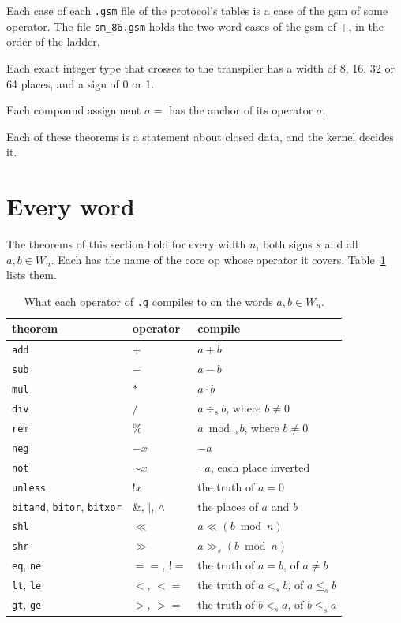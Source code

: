 \begin{theorem}
Each case of each \texttt{.gsm} file of the protocol's tables is a case of the gsm of some operator. The file
\texttt{sm\_86.gsm} holds the two-word cases of the gsm of $+$, in the order of the ladder.
\end{theorem}

\begin{theorem}
Each exact integer type that crosses to the transpiler has a width of 8, 16, 32 or 64 places, and a sign of 0 or 1.
\end{theorem}

\begin{theorem}
Each compound assignment $\sigma{=}$ has the anchor of its operator $\sigma$.
\end{theorem}

Each of these theorems is a statement about closed data, and the kernel decides it.

\section{Every word}

The theorems of this section hold for every width $n$, both signs $s$ and all $a, b \in W_n$. Each has the name
of the core op whose operator it covers. Table~\ref{tab:g-compile} lists them.

\begin{table}[ht]
\centering
\caption{What each operator of \texttt{.g} compiles to on the words $a, b \in W_n$.}\label{tab:g-compile}
\begin{tabular}{lll}
\toprule
theorem & operator & compile \\
\midrule
\texttt{add} & $+$ & $a + b$ \\
\texttt{sub} & $-$ & $a - b$ \\
\texttt{mul} & $*$ & $a \cdot b$ \\
\texttt{div} & $/$ & $a \div_s b$, where $b \neq 0$ \\
\texttt{rem} & $\%$ & $a \bmod_s b$, where $b \neq 0$ \\
\texttt{neg} & $-x$ & $-a$ \\
\texttt{not} & $\sim x$ & $\lnot a$, each place inverted \\
\texttt{unless} & $!x$ & the truth of $a = 0$ \\
\texttt{bitand}, \texttt{bitor}, \texttt{bitxor} & $\&$, $|$, $\wedge$ & the places of $a$ and $b$ \\
\texttt{shl} & $\ll$ & $a \ll (b \bmod n)$ \\
\texttt{shr} & $\gg$ & $a \gg_s (b \bmod n)$ \\
\texttt{eq}, \texttt{ne} & $=\!=$, $!\!=$ & the truth of $a = b$, of $a \neq b$ \\
\texttt{lt}, \texttt{le} & $<$, $<=$ & the truth of $a <_s b$, of $a \le_s b$ \\
\texttt{gt}, \texttt{ge} & $>$, $>=$ & the truth of $b <_s a$, of $b \le_s a$ \\
\bottomrule
\end{tabular}
\end{table}

